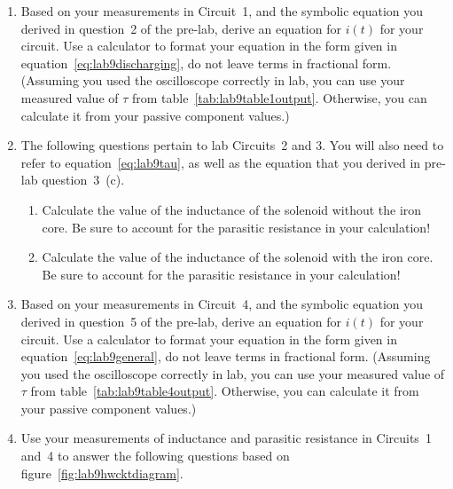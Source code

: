 \begin{enumerate}

\item Based on your measurements in Circuit~1, and the symbolic equation you derived in question~2 of the pre-lab, derive an equation for $i(t)$ for your circuit. Use a calculator to format your equation in the form given in equation~\ref{eq:lab9discharging}, do not leave terms in fractional form. (Assuming you used the oscilloscope correctly in lab, you can use your measured value of $\tau$ from table~\ref{tab:lab9table1output}. Otherwise, you can calculate it from your passive component values.)


\item The following questions pertain to lab Circuits~2 and 3. You will also need to refer to equation~\ref{eq:lab9tau}, as well as the equation that you derived in pre-lab question~3~(c).

\begin{enumerate}
	\item Calculate the value of the inductance of the solenoid without the iron core. Be sure to account for the parasitic resistance in your calculation!

	\item Calculate the value of the inductance of the solenoid with the iron core. Be sure to account for the parasitic resistance in your calculation!
\end{enumerate}

\item Based on your measurements in Circuit~4, and the symbolic equation you derived in question~5 of the pre-lab, derive an equation for $i(t)$ for your circuit. Use a calculator to format your equation in the form given in equation~\ref{eq:lab9general}, do not leave terms in fractional form. (Assuming you used the oscilloscope correctly in lab, you can use your measured value of $\tau$ from table~\ref{tab:lab9table4output}. Otherwise, you can calculate it from your passive component values.)



\clearpage

\item Use your measurements of inductance and parasitic resistance in Circuits~1 and~4 to answer the following questions based on figure~\ref{fig:lab9hwcktdiagram}.


\end{enumerate}
